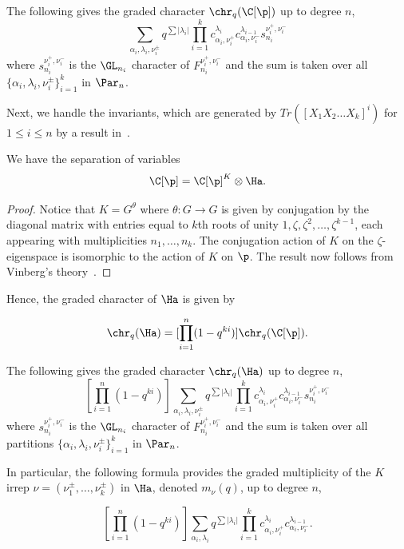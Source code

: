 \begin{cor}
    The following gives the graded character $\chr_q(\C[\p])$ up to degree $n$,
    $$\sum_{\alpha_i, \lambda_i, \nu_i^\pm} q^{\sum |\lambda_i|}\prod_{i=1}^k
    c^{\lambda_i}_{\alpha_i, \nu_i^+} c^{\lambda_{i-1}}_{\alpha_i, \nu_i^-} 
    s^{\nu_i^+, \nu_i^-}_{n_i}$$
where $s^{\nu_i^+, \nu_i^-}_{n_i}$ is the $\GL_{n_i}$ character of $F^{\nu_i^+, \nu_i^-}_{n_i}$ and the sum is taken over all $\{\alpha_i, \lambda_i, \nu_i^\pm\}_{i=1}^k$ in $\Par_n$.
    
\end{cor}

Next, we handle the invariants, which are generated by $Tr([X_1 X_2 \dots X_k]^i)$ for $1 \leq i \leq n$ by a result in~\cite{LeBryunProcesi1990}.
\begin{prop}
    We have the separation of variables
    \begin{equation*}
        \C[\p] = \C[\p]^K \otimes \Ha.
    \end{equation*}
\end{prop}
\begin{proof}
    Notice that $K = G^\theta$ where $\theta:G \to G$ is given by conjugation by the diagonal matrix with entries equal to $k$th roots of unity $1,\zeta,\zeta^2,\dots,\zeta^{k-1}$, each appearing with multiplicities $n_1,\dots,n_k$. The conjugation action of $K$ on the $\zeta$-eigenspace is isomorphic to the action of $K$ on $\p$. The result now follows from Vinberg's theory~\cite{Vinberg1976}.
\end{proof}
 
Hence, the graded character of $\Ha$ is given by

$$\chr_q(\Ha) = [\prod_{i=1}^n(1-q^{ki})]\chr_q(\C[\p]).$$

\begin{cor} \label{cor-gradedHchar}
    The following gives the graded character $\chr_q(\Ha)$ up to degree $n$,
    $$[\prod_{i=1}^n(1-q^{ki})]\sum_{\alpha_i, \lambda_i, \nu_i^\pm} q^{\sum |\lambda_i|}\prod_{i=1}^k
    c^{\lambda_i}_{\alpha_i, \nu_i^+} c^{\lambda_{i-1}}_{\alpha_i, \nu_i^-} 
    s^{\nu_i^+, \nu_i^-}_{n_i}$$
 where $s^{\nu_i^+, \nu_i^-}_{n_i}$ is the $\GL_{n_i}$ character of $F^{\nu_i^+, \nu_i^-}_{n_i}$ and the sum is taken over all partitions $\{\alpha_i, \lambda_i, \nu_i^\pm\}_{i=1}^k$ in $\Par_n$.

    In particular, the following formula provides the graded multiplicity of the $K$ irrep $\nu = (\nu_1^\pm, \dots , \nu_k^\pm)$ in $\Ha$, denoted $m_{\nu}(q)$, up to degree $n$,

    $$[\prod_{i=1}^n(1-q^{ki})]\sum_{\alpha_i, \lambda_i} q^{\sum |\lambda_i|}\prod_{i=1}^k
    c^{\lambda_i}_{\alpha_i, \nu_i^+} c^{\lambda_{i-1}}_{\alpha_i, \nu_i^-}.$$
\end{cor}

